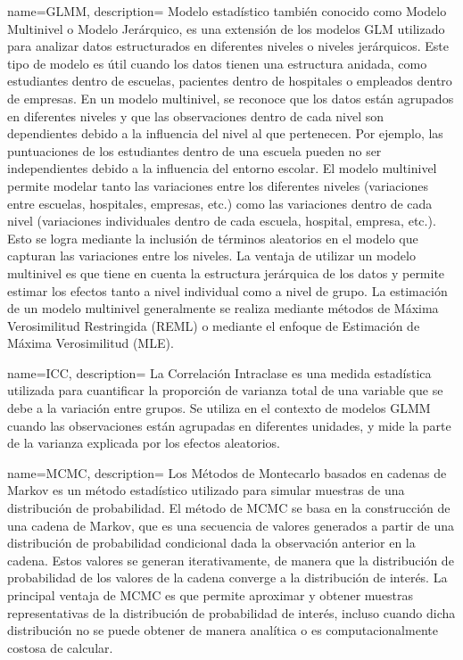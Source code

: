 {
    name=GLMM,
    description={
        Modelo estadístico también conocido como Modelo Multinivel o Modelo Jerárquico,
        es una extensión de los modelos \gls{GLM} utilizado para analizar datos estructurados en diferentes niveles o niveles jerárquicos.
        Este tipo de modelo es útil cuando los datos tienen una estructura anidada, como estudiantes dentro de escuelas,
        pacientes dentro de hospitales o empleados dentro de empresas.
        En un modelo multinivel, se reconoce que los datos están agrupados en diferentes niveles
        y que las observaciones dentro de cada nivel son dependientes debido a la influencia del nivel
        al que pertenecen. Por ejemplo, las puntuaciones de los estudiantes dentro de una escuela pueden no ser independientes
        debido a la influencia del entorno escolar.
        El modelo multinivel permite modelar tanto las variaciones entre los diferentes niveles
        (variaciones entre escuelas, hospitales, empresas, etc.)
        como las variaciones dentro de cada nivel (variaciones individuales dentro de cada escuela, hospital, empresa, etc.).
        Esto se logra mediante la inclusión de términos aleatorios en el modelo que capturan
        las variaciones entre los niveles. La ventaja de utilizar un modelo multinivel es que tiene en cuenta la estructura jerárquica de los datos y permite estimar los efectos tanto a nivel individual como a nivel de grupo. La estimación de un modelo multinivel generalmente se realiza mediante métodos de Máxima Verosimilitud Restringida (REML) o mediante el enfoque de Estimación de Máxima Verosimilitud (MLE).
    }
}


{
    name=ICC,
    description={
        La Correlación Intraclase es una medida estadística utilizada para cuantificar la proporción de varianza total
        de una variable que se debe a la variación entre grupos. Se utiliza en el contexto de modelos \gls{GLMM}
        cuando las observaciones están agrupadas en diferentes unidades,
        y mide la parte de la varianza explicada por los
        efectos aleatorios.
    }
}

{
    name=MCMC,
    description={
        Los Métodos de Montecarlo basados en cadenas de Markov es un método estadístico utilizado para simular
        muestras de una distribución de probabilidad.
        El método de MCMC se basa en la construcción de una cadena de Markov,
        que es una secuencia de valores generados a partir de una distribución de probabilidad condicional dada
        la observación anterior en la cadena.
        Estos valores se generan iterativamente, de manera que la distribución de probabilidad de los valores
        de la cadena converge a la distribución de interés.        
        La principal ventaja de MCMC es que permite aproximar
        y obtener muestras representativas de la distribución de probabilidad de interés,
        incluso cuando dicha distribución no se puede obtener de manera analítica o es
        computacionalmente costosa de calcular.
    }
}



